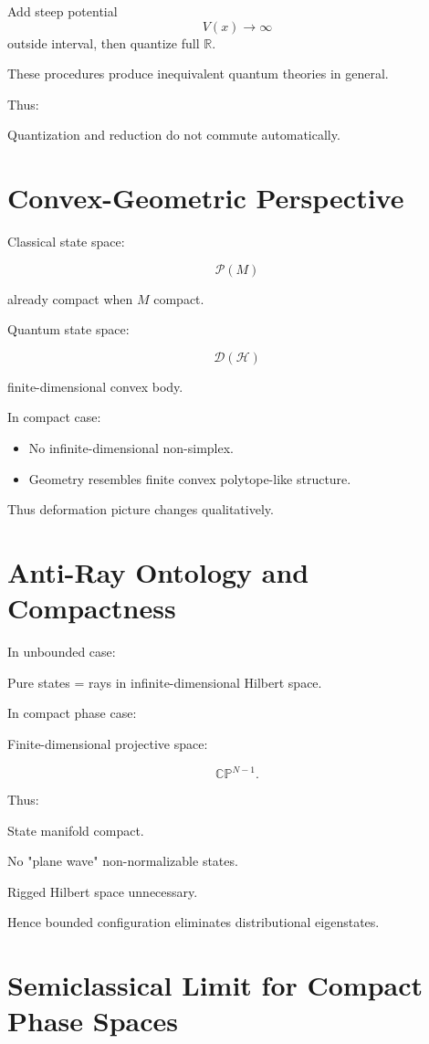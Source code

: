 \documentclass[11pt]{book}
\begin{document}
Add steep potential
\[
V(x) \to \infty
\]
outside interval,
then quantize full $\mathbb{R}$.

These procedures produce inequivalent quantum theories in general.

Thus:

Quantization and reduction do not commute automatically.

\section{Convex-Geometric Perspective}

Classical state space:

\[
\mathcal{P}(M)
\]

already compact when $M$ compact.

Quantum state space:

\[
\mathcal{D}(\mathcal{H})
\]

finite-dimensional convex body.

In compact case:

\begin{itemize}
\item No infinite-dimensional non-simplex.
\item Geometry resembles finite convex polytope-like structure.
\end{itemize}

Thus deformation picture changes qualitatively.

\section{Anti-Ray Ontology and Compactness}

In unbounded case:

Pure states = rays in infinite-dimensional Hilbert space.

In compact phase case:

Finite-dimensional projective space:

\[
\mathbb{CP}^{N-1}.
\]

Thus:

State manifold compact.

No "plane wave" non-normalizable states.

Rigged Hilbert space unnecessary.

Hence bounded configuration eliminates distributional eigenstates.

\section{Semiclassical Limit for Compact Phase Spaces}
\end{document}
